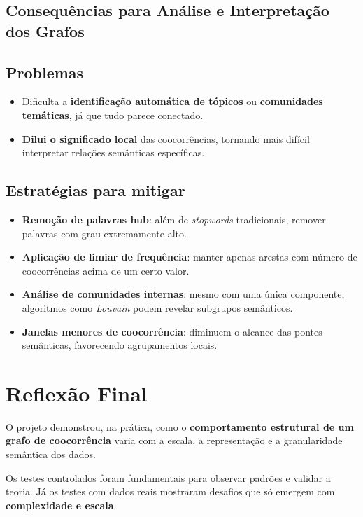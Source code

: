 \documentclass[12pt]{article}
\begin{document}
\subsection{Consequências para Análise e Interpretação dos Grafos}

\subsection*{Problemas}
\begin{itemize}
    \item Dificulta a \textbf{identificação automática de tópicos} ou \textbf{comunidades temáticas}, já que tudo parece conectado.
    \item \textbf{Dilui o significado local} das coocorrências, tornando mais difícil interpretar relações semânticas específicas.
\end{itemize}

\subsection*{Estratégias para mitigar}
\begin{itemize}
    \item \textbf{Remoção de palavras hub}: além de \textit{stopwords} tradicionais, remover palavras com grau extremamente alto.
    \item \textbf{Aplicação de limiar de frequência}: manter apenas arestas com número de coocorrências acima de um certo valor.
    \item \textbf{Análise de comunidades internas}: mesmo com uma única componente, algoritmos como \textit{Louvain} podem revelar subgrupos semânticos.
    \item \textbf{Janelas menores de coocorrência}: diminuem o alcance das pontes semânticas, favorecendo agrupamentos locais.
\end{itemize}

\section{Reflexão Final}

O projeto demonstrou, na prática, como o \textbf{comportamento estrutural de um grafo de coocorrência} varia com a escala, a representação e a granularidade semântica dos dados.

Os testes controlados foram fundamentais para observar padrões e validar a teoria. Já os testes com dados reais mostraram desafios que só emergem com \textbf{complexidade e escala}.
\end{document}
